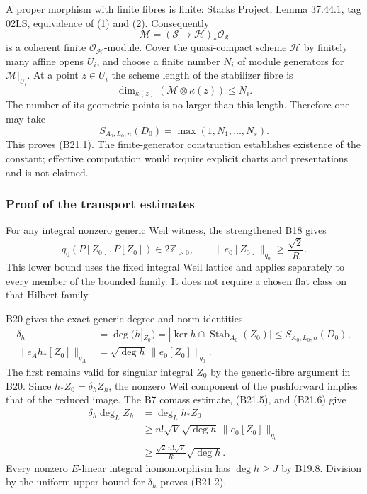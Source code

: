 A proper morphism with finite fibres is finite: Stacks Project, Lemma 37.44.1, tag 02LS, equivalence of (1) and (2). Consequently \[
 \mathcal M=(\mathcal S\to\mathcal H)_*\mathcal O_{\mathcal S}
\] is a coherent finite \(\mathcal O_{\mathcal H}\)-module. Cover the quasi-compact scheme \(\mathcal H\) by finitely many affine opens \(U_i\), and choose a finite number \(N_i\) of module generators for \(\mathcal M|_{U_i}\). At a point \(z\in U_i\) the scheme length of the stabilizer fibre is \[
 \dim_{\kappa(z)}(\mathcal M\otimes\kappa(z))\le N_i.
\] The number of its geometric points is no larger than this length. Therefore one may take \[
 S_{A_0,L_0,n}(D_0)=\max(1,N_1,\ldots,N_s).
\] This proves (B21.1). The finite-generator construction establishes existence of the constant; effective computation would require explicit charts and presentations and is not claimed.

\subsubsection{Proof of the transport estimates}\label{proof-of-the-transport-estimates}

For any integral nonzero generic Weil witness, the strengthened B18 gives \[
 q_0(P[Z_0],P[Z_0])\in2\mathbb Z_{>0},
 \qquad
 \|e_0[Z_0]\|_{q_0}\ge\frac{\sqrt2}{R}.
\tag{B21.5}
\] This lower bound uses the fixed integral Weil lattice and applies separately to every member of the bounded family. It does not require a chosen flat class on that Hilbert family.

B20 gives the exact generic-degree and norm identities \[
 \begin{aligned}
 \delta_h&=\deg(h|_{Z_0})
   =|\ker h\cap\operatorname{Stab}_{A_0}(Z_0)|
   \le S_{A_0,L_0,n}(D_0),\\
 \|e_A h_*[Z_0]\|_{q_A}
   &=\sqrt{\deg h}\,\|e_0[Z_0]\|_{q_0}.
 \end{aligned}
\tag{B21.6}
\] The first remains valid for singular integral \(Z_0\) by the generic-fibre argument in B20. Since \(h_*Z_0=\delta_h Z_h\), the nonzero Weil component of the pushforward implies that of the reduced image. The B7 comass estimate, (B21.5), and (B21.6) give \[
 \begin{aligned}
 \delta_h\deg_L Z_h
 &=\deg_L h_*Z_0\\
 &\ge n!\sqrt V\,\sqrt{\deg h}\,\|e_0[Z_0]\|_{q_0}\\
 &\ge \frac{\sqrt2\,n!\sqrt V}{R}\sqrt{\deg h}.
 \end{aligned}
\] Every nonzero \(E\)-linear integral homomorphism has \(\deg h\ge J\) by B19.8. Division by the uniform upper bound for \(\delta_h\) proves (B21.2).

